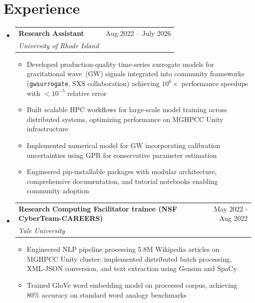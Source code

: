 \documentclass[letterpaper,11pt]{article}
\makeatletter
\newcommand{\resumeItem}[1]{
  \item\small{
    {#1 \vspace{-2pt}}
  }
}
\newcommand{\resumeSubheading}[4]{
  \vspace{-2pt}\item
    \begin{tabular*}{0.97\textwidth}[t]{l@{\extracolsep{\fill}}r}
      \textbf{#1} & #2 \\
      \textit{\small#3} & \textit{\small #4} \\
    \end{tabular*}\vspace{-7pt}
}
\newcommand{\resumeSubSubheading}[2]{
    \item
    \begin{tabular*}{0.97\textwidth}{l@{\extracolsep{\fill}}r}
      \textit{\small#1} & \textit{\small #2} \\
    \end{tabular*}\vspace{-7pt}
}
\newcommand{\resumeSubHeadingListStart}{\begin{itemize}[leftmargin=0.15in, label={}]}
\newcommand{\resumeSubHeadingListEnd}{\end{itemize}}
\newcommand{\resumeItemListStart}{\begin{itemize}}
\newcommand{\resumeItemListEnd}{\end{itemize}\vspace{-5pt}}
\makeatother
\begin{document}
\section{Experience}
  \resumeSubHeadingListStart

    \resumeSubheading
      {Research Assistant}{Aug 2022 -- July 2026}
      {University of Rhode Island}{}
      \resumeItemListStart
        \resumeItem{Developed production-quality time-series surrogate models for gravitational wave~(GW) signals integrated 
        into community frameworks (\texttt{gwsurrogate}, SXS collaboration) achieving $10^6\times$ performance speedups with 
        $<10^{-5}$ relative error}
        \resumeItem{Built scalable HPC workflows for large-scale model training across distributed systems, 
        optimizing performance on MGHPCC Unity infrastructure}
        \resumeItem{Implemented numerical model for GW incorporating calibration uncertainties using 
        GPR for conservative parameter estimation}
        \resumeItem{Engineered pip-installable packages with modular architecture, comprehensive documentation, 
        and tutorial notebooks enabling community adoption}
      \resumeItemListEnd
      

    \resumeSubheading
      {Research Computing Facilitator trainee (NSF CyberTeam-CAREERS)}{May 2022 - Aug 2022}
      {Yale University}{}
      \resumeItemListStart
        \resumeItem{Engineered NLP pipeline processing 5.8M Wikipedia articles on MGHPCC Unity 
        cluster; implemented distributed batch processing, XML-JSON conversion, and text extraction 
        using Gensim and SpaCy}
        \resumeItem{Trained GloVe word embedding model on processed corpus, achieving 
        80\% accuracy on standard word analogy benchmarks}

    \resumeItemListEnd

  \resumeSubHeadingListEnd
\end{document}
